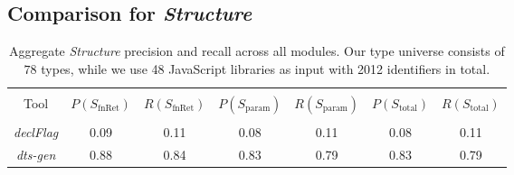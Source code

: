\documentclass[sigplan,10pt,review,anonymous]{acmart} %
\theoremstyle{plain}
\theoremstyle{remark}
\theoremstyle{definition}
\begin{document}

\subsection{Comparison for \textit{Structure}} \label{ssec:structure_comparison}

\begin{table*}[t]
  \centering
  \caption{Aggregate \textit{Structure} precision and recall across all modules.
    Our type universe consists of $78$ types, while we use 48 JavaScript libraries as input with 2012 identifiers in total.} \label{tab:structprec}
  \begin{tabular}{ccccccc}
    \toprule                                                                                                                                              \\
    Tool              & $P(S_\text{fnRet})$ & $R(S_\text{fnRet})$ & $P(S_\text{param})$ & $R(S_\text{param})$ & $P(S_\text{total})$ & $R(S_\text{total})$ \\
    \midrule                                                                                                                                              \\
    \textit{declFlag} & 0.09                & 0.11                & 0.08                & 0.11                & 0.08                & 0.11                \\
    \textit{dts-gen}  & 0.88                & 0.84                & 0.83                & 0.79                & 0.83                & 0.79                \\
    \bottomrule
  \end{tabular}
\end{table*}
\end{document}
